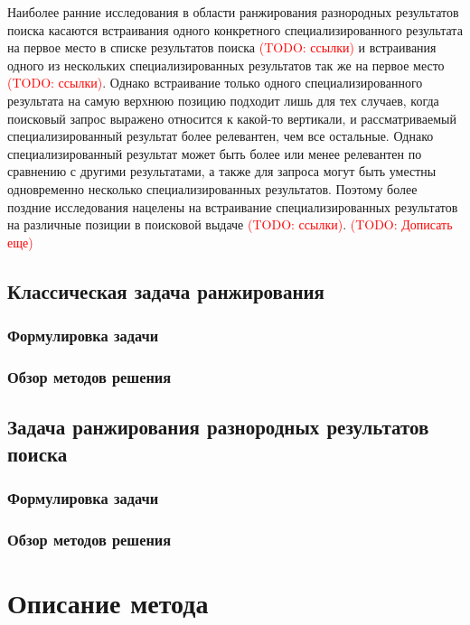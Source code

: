 \documentclass[12pt,a4paper]{report}
\newcommand\note[1]{\textcolor{red}{(#1)}}
\newcommand\todonote[1]{\note{TODO: #1}}
\begin{document}
Наиболее ранние исследования в области ранжирования разнородных результатов поиска касаются встраивания одного конкретного специализированного результата на первое место в списке результатов поиска \todonote{ссылки} и встраивания одного из нескольких специализированных результатов так же на первое место \todonote{ссылки}. Однако встраивание только одного специализированного результата на самую верхнюю позицию подходит лишь для тех случаев, когда поисковый запрос выражено относится к какой-то вертикали, и рассматриваемый специализированный результат более релевантен, чем все остальные. Однако специализированный результат может быть более или менее релевантен по сравнению с другими результатами, а также для запроса могут быть уместны одновременно несколько специализированных результатов. Поэтому более поздние исследования нацелены на встраивание специализированных результатов на различные позиции в поисковой выдаче \todonote{ссылки}. \todonote{Дописать еще}


\section{Классическая задача ранжирования}
\subsection{Формулировка задачи}
\subsection{Обзор методов решения}

\section{Задача ранжирования разнородных результатов поиска}
\subsection{Формулировка задачи}
\subsection{Обзор методов решения}

\chapter{Описание метода}
\end{document}

